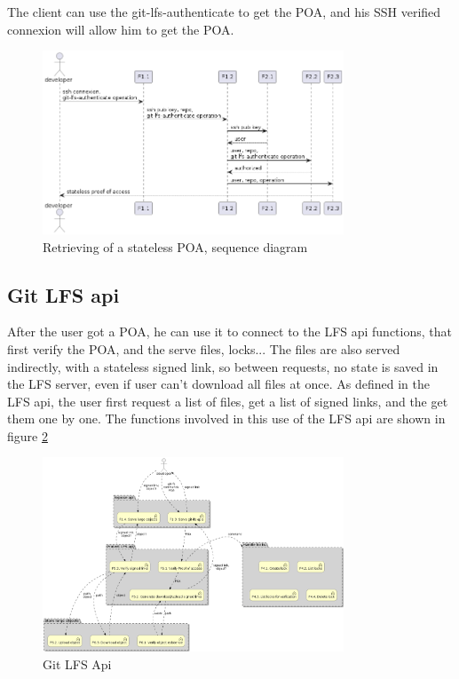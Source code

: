 The client can use the git-lfs-authenticate to get the POA, and his SSH verified connexion will allow him to get the POA.

\begin{figure}[H]
    \centering
    \includegraphics[width=0.8\textwidth]{design/diagrams/poa_flow_sequence.png}
    \caption{Retrieving of a stateless POA, sequence diagram}
    \label{fig:poa_flow_sequence}
\end{figure}

\subsection{Git LFS api}

After the user got a POA, he can use it to connect to the LFS api functions, that first verify the POA, and the serve files, locks... The files are also served indirectly, with a stateless signed link, so between requests, no state is saved in the LFS server, even if user can't download all files at once. As defined in the LFS api, the user first request a list of files, get a list of signed links, and the get them one by one. The functions involved in this use of the LFS api are shown in figure \ref{fig:signed_link_flow}

\begin{figure}[H]
    \centering
    \includegraphics[width=0.8\textwidth]{design/diagrams/signed_link_flow.png}
    \caption{Git LFS Api}
    \label{fig:signed_link_flow}
\end{figure}

